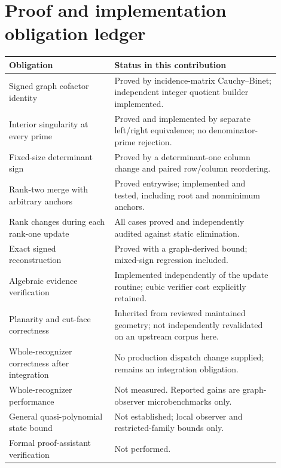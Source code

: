 \documentclass[11pt,letterpaper]{article}
\theoremstyle{definition}\newtheorem{definition}[theorem]{Definition}
\theoremstyle{remark}\newtheorem{remark}[theorem]{Remark}
\begin{document}
\section{Proof and implementation obligation ledger}
\begin{longtable}{p{0.35\linewidth}p{0.55\linewidth}}
\toprule
Obligation & Status in this contribution\\
\midrule
\endhead
Signed graph cofactor identity & Proved by incidence-matrix Cauchy--Binet; independent integer quotient builder implemented.\\
Interior singularity at every prime & Proved and implemented by separate left/right equivalence; no denominator-prime rejection.\\
Fixed-size determinant sign & Proved by a determinant-one column change and paired row/column reordering.\\
Rank-two merge with arbitrary anchors & Proved entrywise; implemented and tested, including root and nonminimum anchors.\\
Rank changes during each rank-one update & All cases proved and independently audited against static elimination.\\
Exact signed reconstruction & Proved with a graph-derived bound; mixed-sign regression included.\\
Algebraic evidence verification & Implemented independently of the update routine; cubic verifier cost explicitly retained.\\
Planarity and cut-face correctness & Inherited from reviewed maintained geometry; not independently revalidated on an upstream corpus here.\\
Whole-recognizer correctness after integration & No production dispatch change supplied; remains an integration obligation.\\
Whole-recognizer performance & Not measured. Reported gains are graph-observer microbenchmarks only.\\
General quasi-polynomial state bound & Not established; local observer and restricted-family bounds only.\\
Formal proof-assistant verification & Not performed.\\
\bottomrule
\end{longtable}
\end{document}
